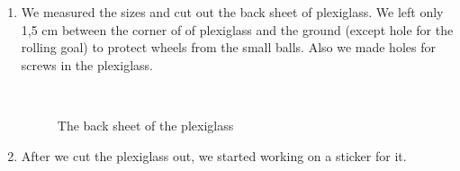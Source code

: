 \begin{enumerate}
\begin{enumerate}
        \item We measured the sizes and cut out the back sheet of plexiglass. We left only 1,5 cm between the corner of of plexiglass and the ground (except hole for the rolling goal) to protect wheels from the small balls. Also we made holes for screws in the plexiglass.
        \begin{figure}[H]
        	\begin{minipage}[h]{0.2\linewidth}
        		\center  
        	\end{minipage}
        	\begin{minipage}[h]{0.6\linewidth}
        		\caption{The back sheet of the plexiglass}
        	\end{minipage}
        \end{figure}
        
        \item After we cut the plexiglass out, we started working on a sticker for it.
        

\end{enumerate}
\end{enumerate}
